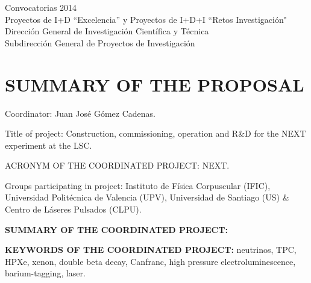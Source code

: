 \documentclass[a4paper,11pt,oneside]{article}
\begin{document}


\begin{center}
{\Large \textsf{Convocatorias 2014}} \\ \vspace{0.3cm}
{\Large  \textsf{Proyectos de I+D ``Excelencia'' y Proyectos de I+D+I ``Retos Investigación"}} \\ 
{\Large \textsf{Dirección General de Investigación Científica y Técnica}} \\
{\Large \textsf{Subdirección General de Proyectos de Investigación }} \\ 
\end{center}


\section{\bf \textsf{SUMMARY OF THE PROPOSAL}}

{\sc Coordinator:} Juan José Gómez Cadenas.
\vspace{0.3cm}

{\sc Title of project:} Construction, commissioning, operation and R\&D for the NEXT experiment at the LSC.
\vspace{0.3cm}

{\sc ACRONYM OF THE COORDINATED PROJECT:} NEXT.
\vspace{0.3cm}

{\sc Groups participating in project:} Instituto de Física Corpuscular (IFIC), Universidad Politécnica de Valencia (UPV), Universidad de Santiago (US) \& Centro de Láseres Pulsados (CLPU). 
\vspace{0.3cm}

{\bf SUMMARY OF THE COORDINATED PROJECT:} 
\vspace{0.3cm}



 \vspace{0.3cm}

{\bf KEYWORDS OF THE COORDINATED PROJECT:} neutrinos, TPC, HPXe, xenon, double beta decay, Canfranc, high pressure electroluminescence, barium-tagging, laser. 
\end{document}
